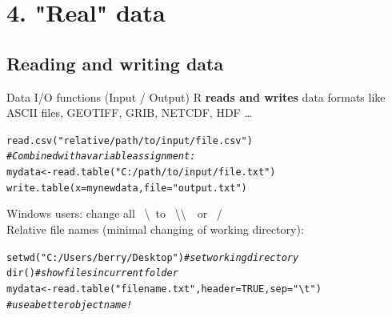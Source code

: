 \documentclass[xcolor=table,           xcolor=dvipsnames]{beamer}\usepackage[]{graphicx}\usepackage[]{color}
\makeatletter
\newcommand{\hlnum}[1]{\textcolor[rgb]{0,0,0}{#1}}
\newcommand{\hlstr}[1]{\textcolor[rgb]{0.545,0.137,0.137}{#1}}
\newcommand{\hlcom}[1]{\textcolor[rgb]{0,0.392,0}{\textit{#1}}}
\newcommand{\hlstd}[1]{\textcolor[rgb]{0,0,0}{#1}}
\newcommand{\hlkwb}[1]{\textcolor[rgb]{0,0,0}{#1}}
\newcommand{\hlkwc}[1]{\textcolor[rgb]{1,0,1}{#1}}
\newcommand{\hlkwd}[1]{\textcolor[rgb]{0,0,1}{#1}}
\newenvironment{kframe}{%
 \def\at@end@of@kframe{}%
 \ifinner\ifhmode%
  \def\at@end@of@kframe{\end{minipage}}%
  \begin{minipage}{\columnwidth}%
 \fi\fi%
 \def\FrameCommand##1{\hskip\@totalleftmargin \hskip-\fboxsep
 \colorbox{shadecolor}{##1}\hskip-\fboxsep
     \hskip-\linewidth \hskip-\@totalleftmargin \hskip\columnwidth}%
 \MakeFramed {\advance\hsize-\width
   \@totalleftmargin\z@ \linewidth\hsize
   \@setminipage}}%
 {\par\unskip\endMakeFramed%
 \at@end@of@kframe}
\newenvironment{knitrout}{}{} %
\makeatother
\begin{document}
\section{4. "Real" data}

\subsection{Reading and writing data}

\begin{frame}[fragile]{Data I/O functions (Input / Output)}
R \textbf{reads and writes} data formats like ASCII files, GEOTIFF, GRIB, NETCDF, HDF \ldots
\pause
\begin{knitrout}
\color{fgcolor}\begin{kframe}
\begin{alltt}
\hlkwd{read.csv}\hlstd{(}\hlstr{"relative/path/to/input/file.csv"}\hlstd{)}
\hlcom{# Combined with a variable assignment:}
\hlstd{mydata} \hlkwb{<-} \hlkwd{read.table}\hlstd{(}\hlstr{"C:/path/to/input/file.txt"}\hlstd{)}
\hlkwd{write.table}\hlstd{(}\hlkwc{x}\hlstd{=mynewdata,} \hlkwc{file}\hlstd{=}\hlstr{"output.txt"}\hlstd{)}
\end{alltt}
\end{kframe}
\end{knitrout}
Windows users: change all \ \textbackslash \ to \ \textbackslash\textbackslash \ \ or \ / \\[\baselineskip]
\pause
Relative file names (minimal changing of working directory):
\begin{knitrout}
\color{fgcolor}\begin{kframe}
\begin{alltt}
\hlkwd{setwd}\hlstd{(}\hlstr{"C:/Users/berry/Desktop"}\hlstd{)} \hlcom{# set working directory}
\hlkwd{dir}\hlstd{()} \hlcom{# show files in current folder}
\hlstd{mydata} \hlkwb{<-} \hlkwd{read.table}\hlstd{(}\hlstr{"filename.txt"}\hlstd{,} \hlkwc{header}\hlstd{=}\hlnum{TRUE}\hlstd{,} \hlkwc{sep}\hlstd{=}\hlstr{"\textbackslash{}t"}\hlstd{)}
\hlcom{# use a better object name!}
\end{alltt}
\end{kframe}
\end{knitrout}
\end{frame}
\end{document}
